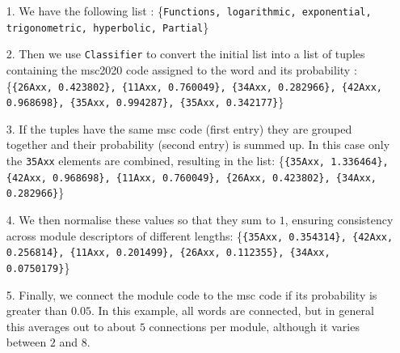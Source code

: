 \documentclass[english, 12pt]{article}
\begin{document}

\begin{itemize}
\item[1.] We have the following list : 
\{\texttt{Functions, logarithmic, exponential, trigonometric, hyperbolic, Partial}\}
\item[2.] Then we use \texttt{Classifier} to convert the initial list into a list of tuples containing the msc2020 code assigned to the word and its probability : 
\{\texttt{\{26Axx, 0.423802\}, \{11Axx, 0.760049\}, \{34Axx, 0.282966\}, \{42Axx, 0.968698\}, \{35Axx, 0.994287\}, \{35Axx, 0.342177\}}\}
\item[3.] If the tuples have the same msc code (first entry) they are grouped together and their probability (second entry) is summed up. In this case only the \texttt{35Axx} elements are combined, resulting in the list: \{\texttt{\{35Axx, 1.336464\}, \{42Axx, 0.968698\}, \{11Axx, 0.760049\}, \{26Axx, 0.423802\}, \{34Axx, 0.282966\}}\}
	\item[4.] We then normalise these values so that they sum to $1$, ensuring consistency across module descriptors of different lengths: \{\texttt{\{35Axx, 0.354314\}, \{42Axx, 0.256814\}, \{11Axx, 0.201499\}, \{26Axx, 0.112355\}, \{34Axx, 0.0750179\}}\}
   	\item[5.] Finally, we connect the module code to the msc code if its probability is greater than $0.05$. In this example, all words are connected, but in general this averages out to about $5$ connections per module, although it varies between $2$ and $8$. 
\end{itemize}
\end{document}
